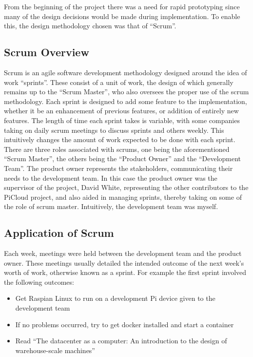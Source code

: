 From the beginning of the project there was a need for rapid prototyping since many of the design decisions would be made during implementation.
To enable this, the design methodology chosen was that of ``Scrum''.

\subsection{Scrum Overview}
Scrum is an agile software development methodology designed around the idea of work ``sprints''.
These consist of a unit of work, the design of which generally remains up to the ``Scrum Master'', who also oversees the proper use of the scrum methodology.
Each sprint is designed to add some feature to the implementation, whether it be an enhancement of previous features, or addition of entirely new features.
The length of time each sprint takes is variable, with some companies taking on daily scrum meetings to discuss sprints and others weekly.
This intuitively changes the amount of work expected to be done with each sprint.
There are three roles associated with scrums, one being the aforementioned ``Scrum Master'', the others being the ``Product Owner'' and the ``Development Team''.
The product owner represents the stakeholders, communicating their needs to the development team.
In this case the product owner was the supervisor of the project, David White, representing the other contributors to the PiCloud project, and also aided in managing sprints, thereby taking on some of the role of scrum master.
Intuitively, the development team was myself.

\subsection{Application of Scrum}
Each week, meetings were held between the development team and the product owner.
These meetings usually detailed the intended outcome of the next week's worth of work, otherwise known as a sprint.
For example the first sprint involved the following outcomes:

\begin{itemize}
	\item Get Raspian Linux to run on a development Pi device given to the development team
	\item If no problems occurred, try to get docker installed and start a container
	\item Read ``The datacenter as a computer: An introduction to the design of warehouse-scale machines''
\end{itemize}

